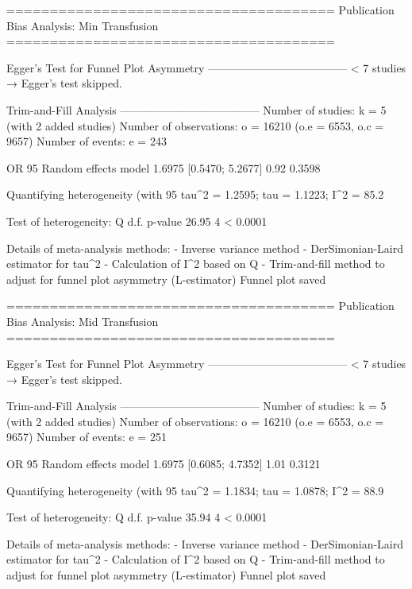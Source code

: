 ======================================
Publication Bias Analysis: Min Transfusion 
======================================
                                                                                                                                                        
Egger's Test for Funnel Plot Asymmetry
--------------------------------------
  < 7 studies → Egger’s test skipped.

Trim-and-Fill Analysis
--------------------------------------
Number of studies: k = 5 (with 2 added studies)
Number of observations: o = 16210 (o.e = 6553, o.c = 9657)
Number of events: e = 243

                         OR           95%
Random effects model 1.6975 [0.5470; 5.2677] 0.92  0.3598

Quantifying heterogeneity (with 95%
 tau^2 = 1.2595; tau = 1.1223; I^2 = 85.2%

Test of heterogeneity:
     Q d.f.  p-value
 26.95    4 < 0.0001

Details of meta-analysis methods:
- Inverse variance method
- DerSimonian-Laird estimator for tau^2
- Calculation of I^2 based on Q
- Trim-and-fill method to adjust for funnel plot asymmetry (L-estimator)
  Funnel plot saved

======================================
Publication Bias Analysis: Mid Transfusion 
======================================
                                                                                                                                                        
Egger's Test for Funnel Plot Asymmetry
--------------------------------------
  < 7 studies → Egger’s test skipped.

Trim-and-Fill Analysis
--------------------------------------
Number of studies: k = 5 (with 2 added studies)
Number of observations: o = 16210 (o.e = 6553, o.c = 9657)
Number of events: e = 251

                         OR           95%
Random effects model 1.6975 [0.6085; 4.7352] 1.01  0.3121

Quantifying heterogeneity (with 95%
 tau^2 = 1.1834; tau = 1.0878; I^2 = 88.9%

Test of heterogeneity:
     Q d.f.  p-value
 35.94    4 < 0.0001

Details of meta-analysis methods:
- Inverse variance method
- DerSimonian-Laird estimator for tau^2
- Calculation of I^2 based on Q
- Trim-and-fill method to adjust for funnel plot asymmetry (L-estimator)
  Funnel plot saved

